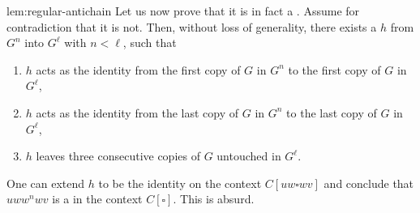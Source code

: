 \begin{proofof}{lem:regular-antichain}
  Let us now prove that 
  it is in fact a . Assume for contradiction 
  that it is not.
  Then, without loss of generality, there exists a 
  $h$
  from $G^n$ into $G^\ell$ with $n < \ell$, such that 
  \begin{enumerate}
    \item $h$ acts as the identity from the first copy of $G$ in 
      $G^n$ to the first copy of $G$ in $G^\ell$,
    \item $h$ acts as the identity from the last copy of $G$ in $G^n$
      to the last copy of $G$ in $G^\ell$,
    \item $h$ leaves three consecutive copies of $G$ untouched in $G^\ell$.
  \end{enumerate}

  One can extend $h$ to be the identity on the 
  context $C[uw \square wv]$ and conclude that 
  $uw w^n wv$ is a  in the context $C[\square]$.
  This is absurd.
\end{proofof}




